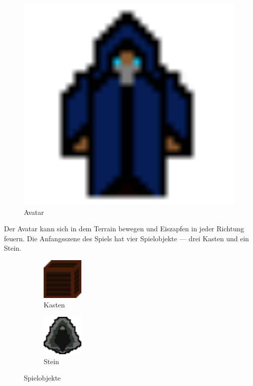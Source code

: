 \documentclass[
  10pt,
  a4paper,
  oneside,
  headers,
  headinclude,
  footinclude,
  BCOR5mm,
]{article}
\begin{document}
\begin{figure}[h]
  \captionsetup{justification=raggedright,singlelinecheck=false}
  \includegraphics[scale=0.10]{MageCharacter}
  \caption{Avatar}
  \label{fig:Avatar}
\end{figure}

\justify
Der Avatar kann sich in dem Terrain bewegen und Eiszapfen in jeder Richtung
feuern. Die Anfangsszene des Spiels hat vier Spielobjekte --- drei Kasten und
ein Stein.

\begin{figure}[h]
  \begin{subfigure}{0.5\textwidth}
    \includegraphics[width=0.3\linewidth, height=2cm]{Box}
    \caption{Kasten}
    \label{fig:Kasten}
  \end{subfigure}
  \begin{subfigure}{0.5\textwidth}
    \includegraphics[width=0.3\linewidth, height=2cm]{Stone}
    \caption{Stein}
    \label{fig:Stein}
  \end{subfigure}

  \caption{Spielobjekte}
  \label{fig:Spielobjekte}
\end{figure}
\end{document}

